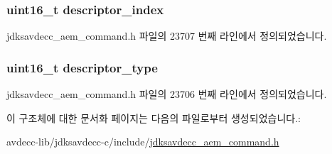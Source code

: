 \subsubsection[{\texorpdfstring{descriptor\+\_\+index}{descriptor_index}}]{\setlength{\rightskip}{0pt plus 5cm}uint16\+\_\+t descriptor\+\_\+index}\hypertarget{structjdksavdecc__aem__command__stop__streaming_a042bbc76d835b82d27c1932431ee38d4}{}\label{structjdksavdecc__aem__command__stop__streaming_a042bbc76d835b82d27c1932431ee38d4}


jdksavdecc\+\_\+aem\+\_\+command.\+h 파일의 23707 번째 라인에서 정의되었습니다.

\subsubsection[{\texorpdfstring{descriptor\+\_\+type}{descriptor_type}}]{\setlength{\rightskip}{0pt plus 5cm}uint16\+\_\+t descriptor\+\_\+type}\hypertarget{structjdksavdecc__aem__command__stop__streaming_ab7c32b6c7131c13d4ea3b7ee2f09b78d}{}\label{structjdksavdecc__aem__command__stop__streaming_ab7c32b6c7131c13d4ea3b7ee2f09b78d}


jdksavdecc\+\_\+aem\+\_\+command.\+h 파일의 23706 번째 라인에서 정의되었습니다.



이 구조체에 대한 문서화 페이지는 다음의 파일로부터 생성되었습니다.\+:\begin{DoxyCompactItemize}
\item 
avdecc-\/lib/jdksavdecc-\/c/include/\hyperlink{jdksavdecc__aem__command_8h}{jdksavdecc\+\_\+aem\+\_\+command.\+h}\end{DoxyCompactItemize}
